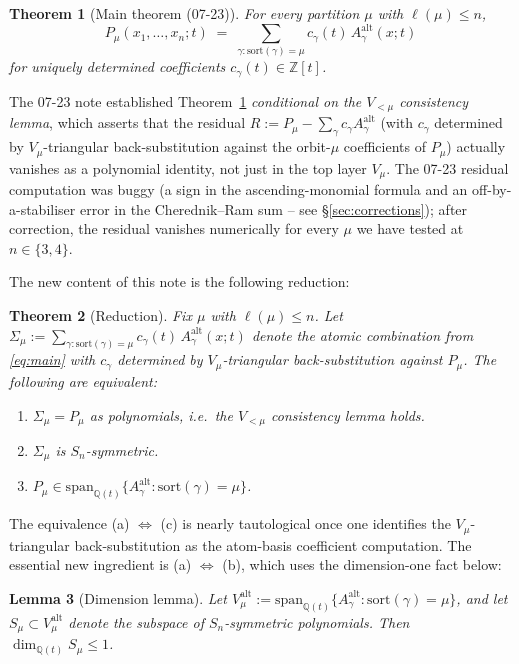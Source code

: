 \documentclass[11pt]{article}
\newtheorem{theorem}{Theorem}
\newtheorem{lemma}[theorem]{Lemma}
\theoremstyle{definition}
\newcommand{\alt}{\mathrm{alt}}
\newcommand{\ZZ}{\mathbb{Z}}
\newcommand{\QQ}{\mathbb{Q}}
\newcommand{\sort}{\mathrm{sort}}
\newcommand{\Sig}{\Sigma_\mu}
\begin{document}
\begin{theorem}[Main theorem (07-23)]\label{thm:main}
For every partition $\mu$ with $\ell(\mu)\le n$,
\begin{equation}\label{eq:main}
P_\mu(x_1,\dots,x_n;t) \;=\; \sum_{\gamma:\sort(\gamma)=\mu} c_\gamma(t)\, A^\alt_\gamma(x;t)
\end{equation}
for uniquely determined coefficients $c_\gamma(t)\in\ZZ[t]$.
\end{theorem}

The 07-23 note established Theorem~\ref{thm:main} \emph{conditional on
the $V_{<\mu}$ consistency lemma}, which asserts that the residual
$R:= P_\mu - \sum_\gamma c_\gamma A^\alt_\gamma$ (with $c_\gamma$
determined by $V_\mu$-triangular back-substitution against the orbit-$\mu$
coefficients of $P_\mu$) actually vanishes as a polynomial identity,
not just in the top layer $V_\mu$.  The 07-23 residual computation was
buggy (a sign in the ascending-monomial formula and an off-by-a-stabiliser
error in the Cherednik--Ram sum -- see \S\ref{sec:corrections}); after
correction, the residual vanishes numerically for every $\mu$ we have
tested at $n\in\{3,4\}$.

The new content of this note is the following reduction:

\begin{theorem}[Reduction]\label{thm:reduction}
Fix $\mu$ with $\ell(\mu)\le n$.  Let
$\Sig := \sum_{\gamma:\sort(\gamma)=\mu} c_\gamma(t)\, A^\alt_\gamma(x;t)$
denote the atomic combination from \eqref{eq:main} with $c_\gamma$
determined by $V_\mu$-triangular back-substitution against $P_\mu$.  The
following are equivalent:
\begin{enumerate}
\item[(a)] $\Sig = P_\mu$ as polynomials, i.e.\ the $V_{<\mu}$
      consistency lemma holds.
\item[(b)] $\Sig$ is $S_n$-symmetric.
\item[(c)] $P_\mu\in\mathrm{span}_{\QQ(t)}\{A^\alt_\gamma : \sort(\gamma) = \mu\}$.
\end{enumerate}
\end{theorem}

The equivalence (a) $\Leftrightarrow$ (c) is nearly tautological once
one identifies the $V_\mu$-triangular back-substitution as the
atom-basis coefficient computation.  The essential new ingredient is
(a) $\Leftrightarrow$ (b), which uses the dimension-one fact below:

\begin{lemma}[Dimension lemma]\label{lem:dim}
Let $V_\mu^\alt := \mathrm{span}_{\QQ(t)}\{A^\alt_\gamma : \sort(\gamma)=\mu\}$,
and let $S_\mu \subset V_\mu^\alt$ denote the subspace of $S_n$-symmetric
polynomials.  Then $\dim_{\QQ(t)} S_\mu \le 1$.
\end{lemma}
\end{document}
